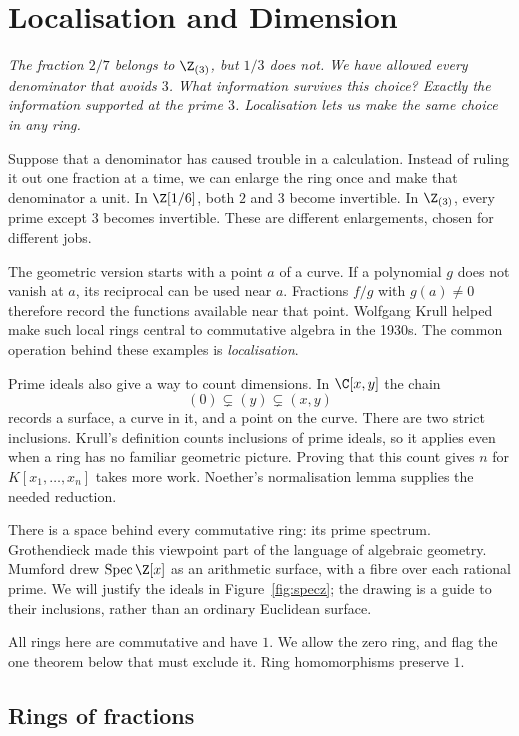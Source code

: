 \chapter{Localisation and Dimension}

\begin{center}\itshape
The fraction $2/7$ belongs to $\Z_{(3)}$, but $1/3$ does not. We have allowed every denominator that avoids $3$. What information survives this choice? Exactly the information supported at the prime $3$. Localisation lets us make the same choice in any ring.
\end{center}

Suppose that a denominator has caused trouble in a calculation. Instead of ruling it out one fraction at a time, we can enlarge the ring once and make that denominator a unit. In $\Z[1/6]$, both $2$ and $3$ become invertible. In $\Z_{(3)}$, every prime except $3$ becomes invertible. These are different enlargements, chosen for different jobs.

The geometric version starts with a point $a$ of a curve. If a polynomial $g$ does not vanish at $a$, its reciprocal can be used near $a$. Fractions $f/g$ with $g(a)\ne0$ therefore record the functions available near that point. Wolfgang Krull helped make such local rings central to commutative algebra in the 1930s. The common operation behind these examples is \emph{localisation}.

Prime ideals also give a way to count dimensions. In $\C[x,y]$ the chain
\[
(0)\subsetneq(y)\subsetneq(x,y)
\]
records a surface, a curve in it, and a point on the curve. There are two strict inclusions. Krull's definition counts inclusions of prime ideals, so it applies even when a ring has no familiar geometric picture. Proving that this count gives $n$ for $K[x_1,\ldots,x_n]$ takes more work. Noether's normalisation lemma supplies the needed reduction.

There is a space behind every commutative ring: its prime spectrum. Grothendieck made this viewpoint part of the language of algebraic geometry. Mumford drew $\operatorname{Spec}\Z[x]$ as an arithmetic surface, with a fibre over each rational prime. We will justify the ideals in Figure~\ref{fig:specz}; the drawing is a guide to their inclusions, rather than an ordinary Euclidean surface.

All rings here are commutative and have $1$. We allow the zero ring, and flag the one theorem below that must exclude it. Ring homomorphisms preserve $1$.

\section{Rings of fractions}

